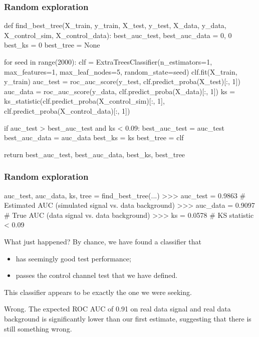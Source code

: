 \documentclass{beamer}
\begin{document}

\begin{frame}[fragile]
\frametitle{Random exploration}

{\scriptsize
\begin{pythoncode}
def find_best_tree(X_train, y_train, X_test, y_test,
                   X_data, y_data, X_control_sim, X_control_data):
    best_auc_test, best_auc_data = 0, 0
    best_ks = 0
    best_tree = None

    for seed in range(2000):
        clf = ExtraTreesClassifier(n_estimators=1, max_features=1,
                                   max_leaf_nodes=5, random_state=seed)
        clf.fit(X_train, y_train)
        auc_test = roc_auc_score(y_test, clf.predict_proba(X_test)[:, 1])
        auc_data = roc_auc_score(y_data, clf.predict_proba(X_data)[:, 1])
        ks = ks_statistic(clf.predict_proba(X_control_sim)[:, 1],
                          clf.predict_proba(X_control_data)[:, 1])

        if auc_test > best_auc_test and ks < 0.09:
            best_auc_test = auc_test
            best_auc_data = auc_data
            best_ks = ks
            best_tree = clf

    return best_auc_test, best_auc_data, best_ks, best_tree
\end{pythoncode}
}

\end{frame}


\begin{frame}[fragile]
\frametitle{Random exploration}

{\scriptsize
\begin{pythoncode}
auc_test, auc_data, ks, tree = find_best_tree(...)
>>> auc_test = 0.9863  # Estimated AUC (simulated signal vs. data background)
>>> auc_data = 0.9097  # True AUC (data signal vs. data background)
>>> ks = 0.0578        # KS statistic < 0.09
\end{pythoncode}
}

\vspace{0.5cm}

What just happened? By chance, we have found a classifier that
\begin{itemize}
\item has seemingly good test performance;
\item passes the control channel test that we have defined.
\end{itemize}
{\color{blue} This classifier appears to be exactly the one we were seeking}.

\vspace{0.5cm}

{\color{red}Wrong}. The expected ROC AUC of 0.91 on real data signal and real
data background is significantly lower than our first estimate, suggesting that
there is still something wrong.

\end{frame}
\end{document}
